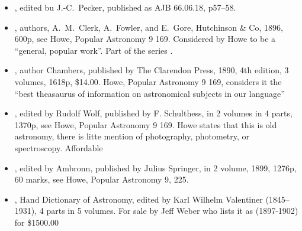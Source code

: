 
\begin{itemize}

  \item {}, edited bu J.-C.~Pecker,
    published as 
    AJB 66.06.18, p57--58.

  \item {}, authors, A.~M.~Clerk,
    A.~Fowler, and E.~Gore, Hutchinson \& Co, 1896, 600p, see Howe,
    Popular Astronomy 9 169.  Considered by Howe to be a ``general,
    popular work''. Part of the series .

  \item {}, author
    Chambers, published by The Clarendon Press, 1890, 4th edition, 3
    volumes, 1618p, \$14.00. Howe, Popular Astronomy 9 169, considers
    it the ``best theasaurus of information on astronomical subjects
    in our language''
    
  \item {}, edited by Rudolf Wolf, published
    by F. Schulthess, in 2 volumes in 4 parts, 1370p, see Howe,
    Popular Astronomy 9 169. Howe states that this is old astronomy,
    there is litte mention of photography, photometry, or
    spectroscopy. Affordable
  
  \item {}, edited by
    Ambronn, published by Julius Springer, in 2 volume, 1899, 1276p,
    60 marks, see Howe, Popular Astronomy 9, 225.
  
  \item {}, Hand
    Dictionary of Astronomy, edited by Karl Wilhelm Valentiner
    (1845--1931), 4 parts in 5 volumes. For sale by Jeff Weber who
    lists it as (1897-1902) for \$1500.00


\end{itemize}
